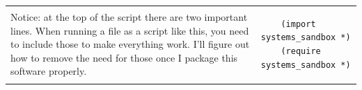 \documentclass[11pt,letter]{article}
\begin{document}
\begin{longtable}{ p{} p{} }
  Notice: at the top of the script there are two important lines.
  When running a file as a script like this, you need to include those to make everything work.
  I'll figure out how to remove the need for those once I package this software properly.
  &
  \begin{lstlisting}
    (import systems_sandbox *)
    (require systems_sandbox *)
  \end{lstlisting}
\end{longtable}
\end{document}

